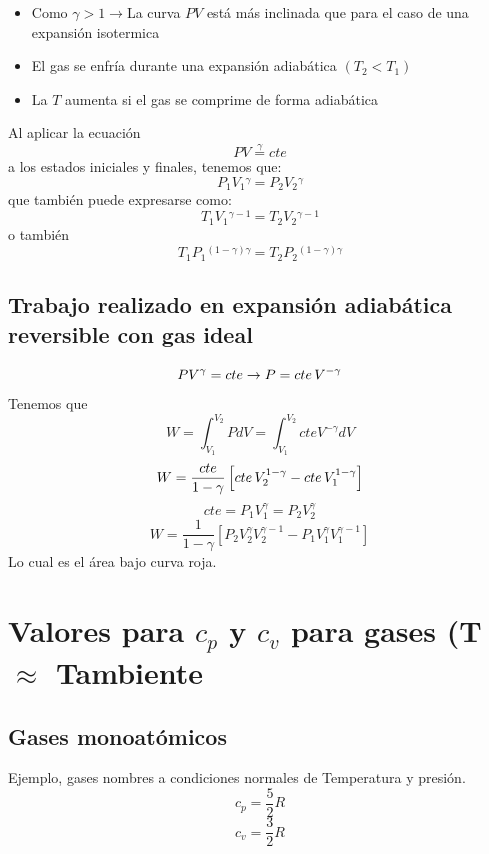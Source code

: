 \documentclass[12pt,twocolumn,a4paper]{report}
\begin{document}
\begin{itemize}
\setlength\itemsep{0.001cm}
\item{Como $\gamma > 1 \rightarrow $La curva $PV$  está más inclinada que para el caso de una expansión isotermica}
\item{El gas se enfría durante una expansión adiabática $(T_2 < T_1)$}
\item{La $T$ aumenta si el gas se comprime de forma adiabática}
\end{itemize}

Al aplicar la ecuación 
$$
PV \stackrel{\gamma}{=} cte 
$$
a los estados iniciales y finales, tenemos que: 
$$
P_1 V_1 \stackrel{\gamma}{} = P_2 V_2 \stackrel{\gamma}{}
$$
que también puede expresarse como:
$$
T_1 V_1 \stackrel{\gamma -1}{} = T_2 V_2 \stackrel{\gamma -1}{}
$$
o también 
$$
T_1 P_1 \stackrel{(1 - \gamma)\gamma}{} = T_2 P_2 \stackrel{(1 - \gamma)\gamma}{}
$$

\subsection*{Trabajo realizado en expansión adiabática reversible con gas ideal}
$$
PV ^{\gamma } = cte \rightarrow P = cte \thinspace V^{-\gamma}
$$
Tenemos que 
$$
W = \int_{V_1} ^{V_2} P dV = \int_{V_1} ^{V_2} cte V ^{-\gamma}dV
$$
$$
W = \dfrac{cte}{1 - \gamma} \left[ cte \thinspace V_2 ^{1 - \gamma} - cte \thinspace V_1 ^{1 - \gamma}\right]
$$
$$
cte = P_1 V_1 ^{\gamma} = P_2 V_2 ^{\gamma}
$$
$$
W = \dfrac{1}{1-\gamma} \left[ P_2 V_2 ^{\gamma}V_2^{\gamma - 1} - P_1 V_1 ^{\gamma} V_1^ {\gamma - 1}\right]
$$
Lo cual es el área bajo curva roja. 

\section*{Valores para $c_p$ y $c_v$ para gases (T $\approx$ Tambiente}
\subsection*{Gases monoatómicos}
Ejemplo, gases nombres a condiciones normales de Temperatura y presión. 
$$
c_p = \dfrac{5}{2}R
$$
$$
c_v = \dfrac{3}{2}R
$$
\end{document}
